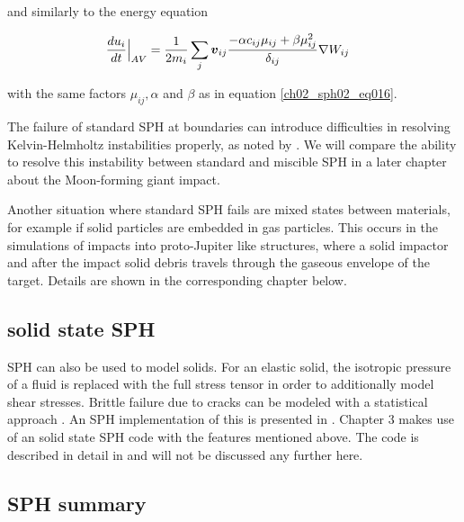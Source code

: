 and similarly to the energy equation

\begin{align}
\label{ch02_sph01_eq035}
\frac{du_i}{dt}  \Big|_{AV} = \frac{1}{2 m_i} & \sum_{j} \boldsymbol{v}_{ij} \frac{- \alpha c_{ij} \mu_{ij} +  \beta \mu_{ij}^2 }{\delta_{ij} } \nabla W_{ij}
\end{align}

with the same factors $\mu_{ij}, \alpha$ and $\beta$ as in equation \ref{ch02_sph02_eq016}. 

The failure of standard SPH at boundaries can introduce difficulties in resolving Kelvin-Helmholtz instabilities properly, as noted by \citep{Agertz:2006p1552}. We will compare the ability to resolve this instability between standard and miscible SPH in a later chapter about the Moon-forming giant impact.

Another situation where standard SPH fails are mixed states between materials, for example if solid particles are embedded in gas particles. This occurs in the simulations of impacts into proto-Jupiter like structures, where a solid impactor and after the impact solid debris travels through the gaseous envelope of the target. Details are shown in the corresponding chapter below. 


\subsection{solid state SPH}
SPH can also be used to model solids. For an elastic solid, the isotropic pressure of a fluid is replaced with the full stress tensor in order to additionally model shear stresses. Brittle failure due to cracks can be modeled with a statistical approach \citep{Grady1980147}. An SPH implementation of this is presented in \citep{1994Icar..107...98B}. %
Chapter 3 makes use of an solid state SPH code with the features mentioned above. The code is described in detail in \citep{Nyffeler:2006p96} and will not be discussed any further here.

\subsection{SPH summary}


